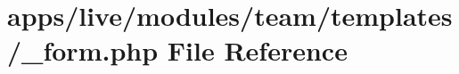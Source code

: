 \hypertarget{live_2modules_2team_2templates_2__form_8php}{\section{apps/live/modules/team/templates/\-\_\-form.php File Reference}
\label{live_2modules_2team_2templates_2__form_8php}
}
